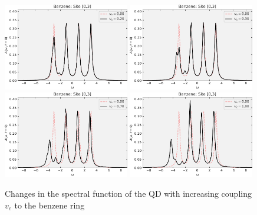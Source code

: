 \begin{figure}[!hbt]
    \centering
    \includegraphics[width=0.49\textwidth]{graph/spectrum_vc_sweep/QD_All_020.pdf}
    \includegraphics[width=0.49\textwidth]{graph/spectrum_vc_sweep/QD_All_030.pdf}
    \includegraphics[width=0.49\textwidth]{graph/spectrum_vc_sweep/QD_All_070.pdf}
    \includegraphics[width=0.49\textwidth]{graph/spectrum_vc_sweep/QD_All_100.pdf}
    \caption{Changes in the spectral function of the QD with increasing coupling $v_c$ to the benzene ring}
    \label{fig:spectrum_vc_sweep_QD}
\end{figure}

